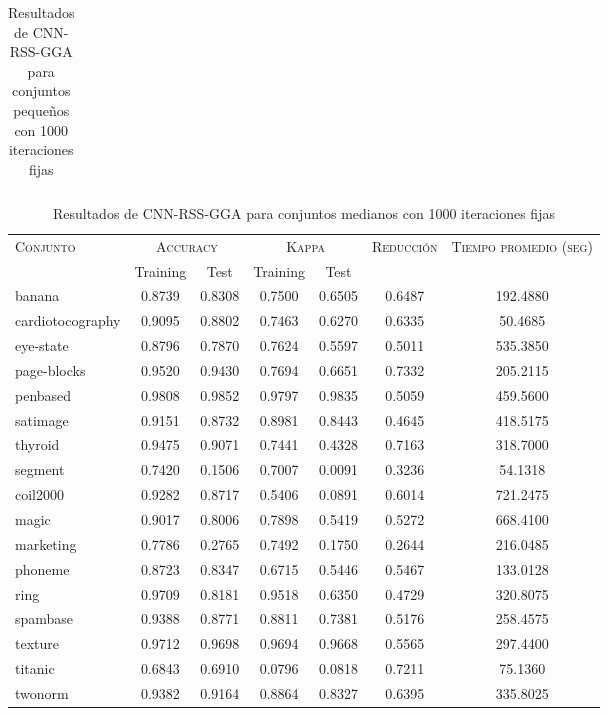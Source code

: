 \begin{table}[]
\begin{tabular}{l c c c c c c}
\hline
\end{tabular}
\caption{Resultados de CNN-RSS-GGA para conjuntos pequeños con 1000 iteraciones fijas}
\label{res-peq-cnn-rss-gga}
\end{table}



\begin{table}[]
\centering
\begin{tabular}{l c c c c c c}
\hline
\multirow{2}{*}{\textsc{Conjunto}}
	& \multicolumn{2}{c}{\textsc{Accuracy}}
	& \multicolumn{2}{c}{\textsc{Kappa}}
	& \textsc{Reducción}
	& \textsc{Tiempo promedio (seg)} \\
	& Training & Test
	& Training & Test \\ 
\hline
\hline

banana & 0.8739 & 0.8308 & 0.7500 & 0.6505 & 0.6487 & 192.4880  \\
cardiotocography & 0.9095 & 0.8802 & 0.7463 & 0.6270 & 0.6335 & 50.4685  \\
eye-state & 0.8796 & 0.7870 & 0.7624 & 0.5597 & 0.5011 &  535.3850  \\
page-blocks & 0.9520 & 0.9430 & 0.7694 & 0.6651 & 0.7332 & 205.2115  \\
penbased & 0.9808 & 0.9852 & 0.9797 & 0.9835 & 0.5059 &  459.5600  \\
satimage & 0.9151 & 0.8732 & 0.8981 & 0.8443 & 0.4645 &  418.5175  \\
thyroid & 0.9475 & 0.9071 & 0.7441 & 0.4328 & 0.7163 &  318.7000  \\
segment & 0.7420 & 0.1506 & 0.7007 & 0.0091 & 0.3236 & 54.1318  \\
coil2000 & 0.9282 & 0.8717 & 0.5406 & 0.0891 & 0.6014 &  721.2475  \\
magic & 0.9017 & 0.8006 & 0.7898 & 0.5419 & 0.5272 &  668.4100  \\
marketing & 0.7786 & 0.2765 & 0.7492 & 0.1750 & 0.2644 & 216.0485  \\
phoneme & 0.8723 & 0.8347 & 0.6715 & 0.5446 & 0.5467 & 133.0128  \\
ring & 0.9709 & 0.8181 & 0.9518 & 0.6350 & 0.4729 &  320.8075  \\
spambase & 0.9388 & 0.8771 & 0.8811 & 0.7381 & 0.5176 &  258.4575  \\
texture & 0.9712 & 0.9698 & 0.9694 & 0.9668 & 0.5565 &  297.4400  \\
titanic & 0.6843 & 0.6910 & 0.0796 & 0.0818 & 0.7211 & 75.1360  \\
twonorm & 0.9382 & 0.9164 & 0.8864 & 0.8327 & 0.6395 &  335.8025  \\

\hline
\end{tabular}
\caption{Resultados de CNN-RSS-GGA para conjuntos medianos con 1000 iteraciones fijas}
\label{res-med-cnn-rss-gga}
\end{table}



